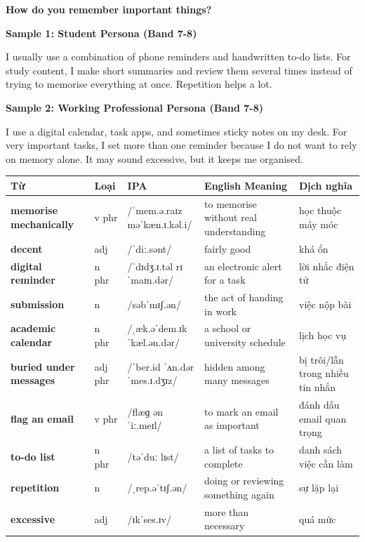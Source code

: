 \separator

\begin{ieltsquestion}
\textbf{How do you remember important things?}
\end{ieltsquestion}
\textbf{Sample 1: Student Persona (Band 7-8)}

I usually use a combination of phone reminders and handwritten to-do lists. For study content, I make short summaries and review them several times instead of trying to memorise everything at once. Repetition helps a lot.

\textbf{Sample 2: Working Professional Persona (Band 7-8)}

I use a digital calendar, task apps, and sometimes sticky notes on my desk. For very important tasks, I set more than one reminder because I do not want to rely on memory alone. It may sound excessive, but it keeps me organised.

\separator


\vspace{0.8em}
\begin{center}
\renewcommand{\arraystretch}{1.65}
\begin{tabularx}{\textwidth}{|V{0.22\textwidth}|C{0.07\textwidth}|I{0.20\textwidth}|Y|V{0.18\textwidth}|}
\hline
{}
\textbf{Từ} & \textbf{Loại} & \textbf{IPA} & \textbf{English Meaning} & \textbf{Dịch nghĩa} \\
\hline
\textbf{memorise mechanically} & v phr & /ˈmem.ə.raɪz məˈkæn.ɪ.kəl.i/ & to memorise without real understanding & học thuộc máy móc \\ \hline
\textbf{decent} & adj & /ˈdiː.sənt/ & fairly good & khá ổn \\ \hline
\textbf{digital reminder} & n phr & /ˈdɪdʒ.ɪ.təl rɪˈmaɪn.dər/ & an electronic alert for a task & lời nhắc điện tử \\ \hline
\textbf{submission} & n & /səbˈmɪʃ.ən/ & the act of handing in work & việc nộp bài \\ \hline
\textbf{academic calendar} & n phr & /ˌæk.əˈdem.ɪk ˈkæl.ən.dər/ & a school or university schedule & lịch học vụ \\ \hline
\textbf{buried under messages} & adj phr & /ˈber.id ˈʌn.dər ˈmes.ɪ.dʒɪz/ & hidden among many messages & bị trôi/lẫn trong nhiều tin nhắn \\ \hline
\textbf{flag an email} & v phr & /flæɡ ən ˈiː.meɪl/ & to mark an email as important & đánh dấu email quan trọng \\ \hline
\textbf{to-do list} & n phr & /təˈduː lɪst/ & a list of tasks to complete & danh sách việc cần làm \\ \hline
\textbf{repetition} & n & /ˌrep.əˈtɪʃ.ən/ & doing or reviewing something again & sự lặp lại \\ \hline
\textbf{excessive} & adj & /ɪkˈses.ɪv/ & more than necessary & quá mức \\ \hline
\end{tabularx}
\end{center}


